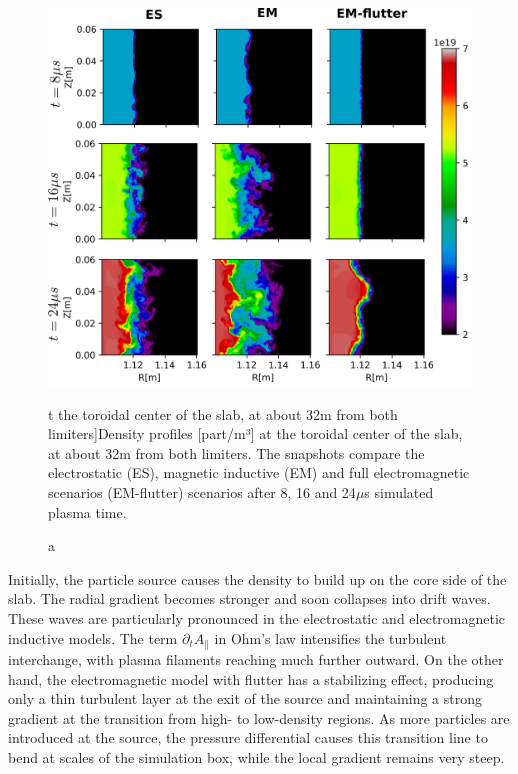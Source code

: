 \begin{figure}[H]\centering
	\centering
	\includegraphics[width=.95\textwidth]{schemes/slab_source.png}
	\caption[Density profiles [part/m³] at the toroidal center of the slab, at about 32m from both limiters]{Density profiles [part/m³] at the toroidal center of the slab, at about 32m from both limiters. The snapshots compare the electrostatic (ES), magnetic inductive (EM) and full electromagnetic scenarios (EM-flutter) scenarios after 8, 16 and 24$\mu$s simulated plasma time.}
	\label{fig:SLABturb}
\end{figure}

Initially, the particle source causes the density to build up on the core side of the slab. The radial gradient becomes stronger and soon collapses into drift waves. These waves are particularly pronounced in the electrostatic and electromagnetic inductive models. The term $\partial_t A_\parallel$ in Ohm's law intensifies the turbulent interchange, with plasma filaments reaching much further outward. On the other hand, the electromagnetic model with flutter has a stabilizing effect, producing only a thin turbulent layer at the exit of the source and maintaining a strong gradient at the transition from high- to low-density regions. As more particles are introduced at the source, the pressure differential causes this transition line to bend at scales of the simulation box, while the local gradient remains very steep. \newline




